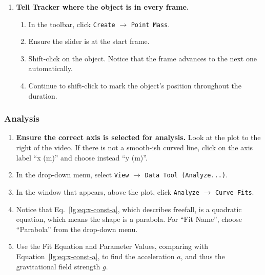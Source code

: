 \begin{enumerate}
	\item \textbf{Tell Tracker where the object is in every frame.}
	\begin{enumerate}
		\item In the toolbar, click \texttt{Create} $\rightarrow$ \texttt{Point Mass}.
		\item Ensure the slider is at the start frame.
		\item Shift-click on the object. Notice that the frame advances to the next one automatically.
		\item Continue to shift-click to mark the object's position throughout the duration.
	\end{enumerate}
\end{enumerate}

\subsubsection{Analysis}

\begin{enumerate}
	\item \textbf{Ensure the correct axis is selected for analysis.} Look at the plot to the right of the video. If there is not a smooth-ish curved line, click on the axis label ``x (m)'' and choose instead ``y (m)''.
	
	\item In the drop-down menu, select \texttt{View} $\rightarrow$ \texttt{Data Tool (Analyze...)}.
	
	\item In the window that appears, above the plot, click \texttt{Analyze} $\rightarrow$ \texttt{Curve Fits}.
	
	\item Notice that Eq.~\ref{lg:eq:x-const-a}, which describes freefall, is a quadratic equation, which means the shape is a parabola. For ``Fit Name'', choose ``Parabola'' from the drop-down menu.
	
	\item Use the Fit Equation and Parameter Values, comparing with Equation~\ref{lg:eq:x-const-a}, to find the acceleration $a$, and thus the gravitational field strength $g$.
	
\end{enumerate}

